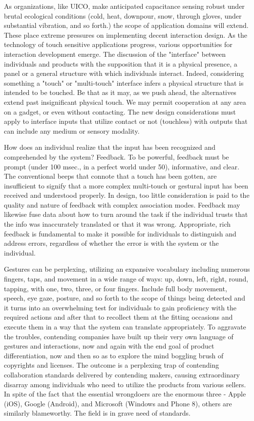 \documentclass{article}
\begin{document}
As organizations, like UICO\cite{rath2009uico}, make anticipated capacitance sensing robust under brutal ecological conditions (cold, heat, downpour, snow, through gloves, under substantial vibration, and so forth.) the scope of application domains will extend. These place extreme pressures on implementing decent interaction design. As the technology of touch sensitive applications progress, various opportunities for interaction development emerge. The discussion of the "interface" between individuals and products with the supposition that it is a physical presence, a panel or a general structure with which individuals interact. Indeed, considering something a "touch" or "multi-touch" interface infers a physical structure that is intended to be touched. Be that as it may, as we push ahead, the alternatives extend past insignificant physical touch. We may permit cooperation at any area on a gadget, or even without contacting. The new design considerations must apply to interface inputs that utilize contact or not (touchless) with outputs that can include any medium or sensory modality.\cite{khan2012hand}

How does an individual realize that the input has been recognized and comprehended by the system? Feedback. To be powerful, feedback must be prompt (under 100 msec., in a perfect world under 50), informative, and clear. The conventional beeps that connote that a touch has been gotten, are insufficient to signify that a more complex multi-touch or gestural input has been received and understood properly. \cite{escalera2017challenges} In design, too little consideration is paid to the quality and nature of feedback with complex association modes. Feedback may likewise fuse data about how to turn around the task if the individual trusts that the info was inaccurately translated or that it was wrong. Appropriate, rich feedback is fundamental to make it possible for individuals to distinguish and address errors, regardless of whether the error is with the system or the individual.

Gestures can be perplexing, utilizing an expansive vocabulary including numerous fingers, taps, and movement in a wide range of ways: up, down, left, right, round, tapping, with one, two, three, or four fingers. Include full body movement, speech, eye gaze, posture, and so forth to the scope of things being detected and it turns into an overwhelming test for individuals to gain proficiency with the required actions and after that to recollect them at the fitting occasions and execute them in a way that the system can translate appropriately. To aggravate the troubles, contending companies have built up their very own language of gestures and interactions, now and again with the end goal of product differentiation, now and then so as to explore the mind boggling brush of copyrights and licenses. \cite{escalera2017challenges} The outcome is a perplexing trap of contending collaboration standards delivered by contending makers, causing extraordinary disarray among individuals who need to utilize the products from various sellers. In spite of the fact that the essential wrongdoers are the enormous three - Apple (iOS), Google (Android), and Microsoft (Windows and Phone 8), others are similarly blameworthy. The field is in grave need of standards.
\end{document}
